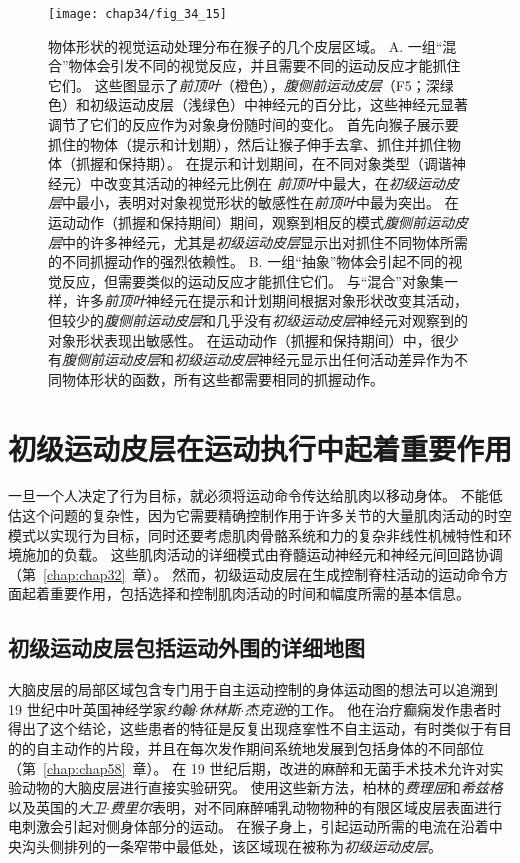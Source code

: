 \begin{figure}[htbp]
	\centering
	\texttt{[image: chap34/fig\_34\_15]}
	\caption{物体形状的视觉运动处理分布在猴子的几个皮层区域\cite{schaffelhofer2016object}。
		A. 一组“混合”物体会引发不同的视觉反应，并且需要不同的运动反应才能抓住它们。
		这些图显示了\textit{前顶叶}（橙色），\textit{腹侧前运动皮层}（F5；深绿色）和初级运动皮层（浅绿色）中神经元的百分比，这些神经元显著调节了它们的反应作为对象身份随时间的变化。
		首先向猴子展示要抓住的物体（提示和计划期），然后让猴子伸手去拿、抓住并抓住物体（抓握和保持期）。
		在提示和计划期间，在不同对象类型（调谐神经元）中改变其活动的神经元比例在 \textit{前顶叶}中最大，在\textit{初级运动皮层}中最小，表明对对象视觉形状的敏感性在\textit{前顶叶}中最为突出。
		在运动动作（抓握和保持期间）期间，观察到相反的模式\textit{腹侧前运动皮层}中的许多神经元，尤其是\textit{初级运动皮层}显示出对抓住不同物体所需的不同抓握动作的强烈依赖性。
		B. 一组“抽象”物体会引起不同的视觉反应，但需要类似的运动反应才能抓住它们。
		与“混合”对象集一样，许多\textit{前顶叶}神经元在提示和计划期间根据对象形状改变其活动，但较少的\textit{腹侧前运动皮层}和几乎没有\textit{初级运动皮层}神经元对观察到的对象形状表现出敏感性。
		在运动动作（抓握和保持期间）中，很少有\textit{腹侧前运动皮层}和\textit{初级运动皮层}神经元显示出任何活动差异作为不同物体形状的函数，所有这些都需要相同的抓握动作。}
	\label{fig:34_15}
\end{figure}



\section{初级运动皮层在运动执行中起着重要作用}

一旦一个人决定了行为目标，就必须将运动命令传达给肌肉以移动身体。
不能低估这个问题的复杂性，因为它需要精确控制作用于许多关节的大量肌肉活动的时空模式以实现行为目标，同时还要考虑肌肉骨骼系统和力的复杂非线性机械特性和环境施加的负载。
这些肌肉活动的详细模式由脊髓运动神经元和神经元间回路协调（第~\ref{chap:chap32}~章）。
然而，初级运动皮层在生成控制脊柱活动的运动命令方面起着重要作用，包括选择和控制肌肉活动的时间和幅度所需的基本信息。



\subsection{初级运动皮层包括运动外围的详细地图}

大脑皮层的局部区域包含专门用于自主运动控制的身体运动图的想法可以追溯到 19 世纪中叶英国神经学家\textit{约翰$\cdot$休林斯$\cdot$杰克逊}的工作。
他在治疗癫痫发作患者时得出了这个结论，这些患者的特征是反复出现痉挛性不自主运动，有时类似于有目的的自主动作的片段，并且在每次发作期间系统地发展到包括身体的不同部位（第~\ref{chap:chap58}~章）。
在 19 世纪后期，改进的麻醉和无菌手术技术允许对实验动物的大脑皮层进行直接实验研究。
使用这些新方法，柏林的\textit{费理屈}和\textit{希兹格}以及英国的\textit{大卫$\cdot$费里尔}表明，对不同麻醉哺乳动物物种的有限区域皮层表面进行电刺激会引起对侧身体部分的运动。
在猴子身上，引起运动所需的电流在沿着中央沟头侧排列的一条窄带中最低处，该区域现在被称为\textit{初级运动皮层}。


